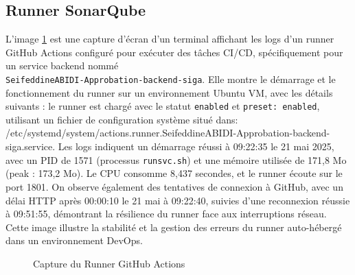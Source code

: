 \subsection{Runner SonarQube}
L'image \ref{fig:ghrun} est une capture d’écran d’un terminal affichant les logs d’un runner GitHub Actions configuré pour exécuter des tâches CI/CD, spécifiquement pour un service backend nommé\\
\texttt{SeifeddineABIDI-Approbation-backend-siga}. Elle montre le démarrage et le fonctionnement du runner sur un environnement Ubuntu VM, avec les détails suivants : le runner est chargé avec le statut \texttt{enabled} et \texttt{preset: enabled},\\
utilisant un fichier de configuration système situé dans:\\ /etc/systemd/system/actions.runner.SeifeddineABIDI-Approbation-backend-siga.service. Les logs indiquent un démarrage réussi à 09:22:35 le 21 mai 2025, avec un PID de 1571 (processus \texttt{runsvc.sh}) et une mémoire utilisée de 171,8 Mo (peak : 173,2 Mo). Le CPU consomme 8,437 secondes, et le runner écoute sur le port 1801. On observe également des tentatives de connexion à GitHub, avec un délai HTTP après 00:00:10 le 21 mai à 09:22:40, suivies d’une reconnexion réussie à 09:51:55, démontrant la résilience du runner face aux interruptions réseau. Cette image illustre la stabilité et la gestion des erreurs du runner auto-hébergé dans un environnement DevOps.
\begin{figure}[h]
    \begin{adjustwidth}{-3.5cm}{-3.5cm}
    \centering
    \caption{Capture du Runner GitHub Actions}
    \label{fig:ghrun}
    \end{adjustwidth}
\end{figure}
